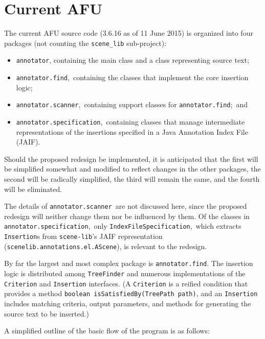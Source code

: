 \documentclass{article}
\begin{document}
\section{Current AFU}

The current AFU source code (3.6.16 as of 11 June 2015) is organized
into four packages (not counting the
\texttt{scene\_lib} sub-project):
\begin{itemize}
\item  \texttt{annotator}, containing the main class and a class
representing source text;
\item  \texttt{annotator.find},\ containing the classes that implement
the core insertion logic;
\item  \texttt{annotator.scanner},\ containing support classes for
\texttt{annotator.find};\ and
\item  \texttt{annotator.specification},\ containing classes that
manage intermediate representations of the insertions specified in a
Java Annotation Index File (JAIF).
\end{itemize}
Should the proposed redesign be implemented, it is anticipated that the
first will be simplified somewhat and modified to reflect changes in the
other packages, the second will be radically simplified, the third will
remain the same, and the fourth will be eliminated.

The details of \texttt{annotator.scanner}\ are not discussed here, since
the proposed redesign will neither change them nor be influenced by
them.  Of the classes in \texttt{annotator.specification},\ only
\texttt{IndexFileSpecification},\ which extracts \texttt{Insertion}s
from \texttt{scene-lib}'s JAIF representation
(\texttt{scenelib.annotations.el.AScene}), is relevant to the redesign.

By far the largest and most complex package is \texttt{annotator.find}.
The insertion logic is distributed among \texttt{TreeFinder} and
numerous implementations of the \texttt{Criterion} and
\texttt{Insertion} interfaces.  (A \texttt{Criterion} is a reified
condition that provides a method
\texttt{boolean isSatisfiedBy(TreePath path)},
and an \texttt{Insertion} includes matching criteria, output parameters,
and methods for generating the source text to be inserted.)

A simplified outline of the basic flow of the program is as follows:
\end{document}
